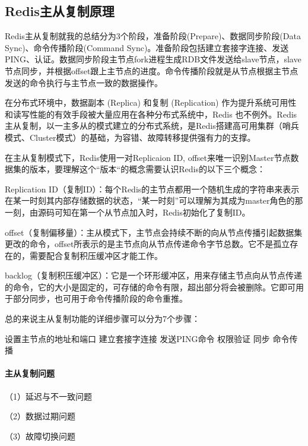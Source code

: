 \documentclass[../../../interview-questions.tex]{subfiles}
\begin{document}
\subsection{Redis主从复制原理}

Redis主从复制就我的总结分为3个阶段，准备阶段(Prepare)、数据同步阶段(Data Sync)、命令传播阶段(Command Sync)。准备阶段包括建立套接字连接、发送PING、认证。数据同步阶段主节点fork进程生成RDB文件发送给slave节点，slave节点同步，并根据offset跟上主节点的进度。命令传播阶段就是从节点根据主节点发送的命令执行与主节点一致的数据操作。

在分布式环境中，数据副本 (Replica) 和复制 (Replication) 作为提升系统可用性和读写性能的有效手段被大量应用在各种分布式系统中，Redis 也不例外。Redis主从复制，以一主多从的模式建立的分布式系统，是Redis搭建高可用集群（哨兵模式、Cluster模式）的基础，为容错、故障转移提供强有力的支撑。

在主从复制模式下，Redis使用一对Replicaion ID, offset来唯一识别Master节点数据集的版本，要理解这个“版本“的概念需要认识Redis的以下三个概念：

Replication ID（复制ID）：每个Redis的主节点都用一个随机生成的字符串来表示在某一时刻其内部存储数据的状态，“某一时刻”可以理解为其成为master角色的那一刻，由源码可知在第一个从节点加入时，Redis初始化了复制ID。

offset（复制偏移量）：主从模式下，主节点会持续不断的向从节点传播引起数据集更改的命令，offset所表示的是主节点向从节点传递命令字节总数。它不是孤立存在的，需要配合复制积压缓冲区才能工作。

backlog（复制积压缓冲区）：它是一个环形缓冲区，用来存储主节点向从节点传递的命令，它的大小是固定的，可存储的命令有限，超出部分将会被删除。它即可用于部分同步，也可用于命令传播阶段的命令重推。



总的来说主从复制功能的详细步骤可以分为7个步骤：

设置主节点的地址和端口
建立套接字连接
发送PING命令
权限验证
同步
命令传播

\paragraph{主从复制问题}

（1）延迟与不一致问题

（2）数据过期问题

（3）故障切换问题
\end{document}
